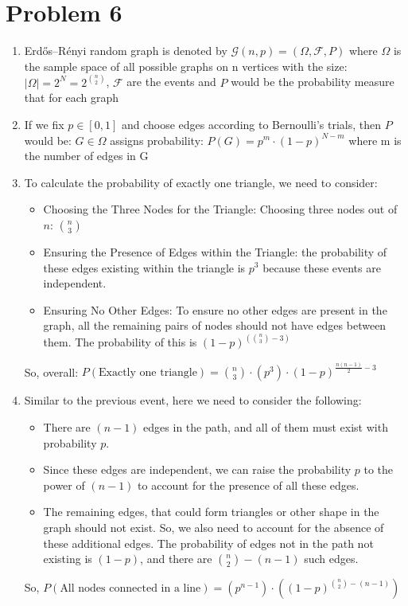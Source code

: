 	\section*{Problem 6}\label{sec:prob-6}
	\begin{enumerate}
	\item Erd\H{o}s--R\'enyi random graph is denoted by $\mathcal{G}(n,p) = (\Omega, \mathcal{F}, P)$  where $ \Omega $ is the sample space of all possible graphs on n vertices with the size: $ |\Omega| = 2^N = 2^{n \choose 2}$, $ \mathcal{F} $ are the events and $ P $ would be the probability measure that for each graph
	\item If we fix $ p \in [0, 1] $ and choose edges according to Bernoulli’s trials, then $ P $ would be: $G \in \Omega $ assigns probability: $ P(G) = p^m \cdot (1 - p)^{N - m} $
	where m is the number of edges in G
	\item To calculate the probability of exactly one triangle, we need to consider:
	\begin{itemize}
	\item Choosing the Three Nodes for the Triangle:
	Choosing three nodes out of $ n $: $ {n \choose 3} $
	\item Ensuring the Presence of Edges within the Triangle:
	the probability of these edges existing within the triangle is $ p^3 $ because these events are independent.
	\item Ensuring No Other Edges:
	To ensure no other edges are present in the graph, all the remaining pairs of nodes should not have edges between them. The probability of this is $ (1-p)^{({n \choose 3} - 3)} $
	\end{itemize}	
	So, overall: $ P(\text{Exactly one triangle}) = \binom{n}{3} \cdot (p^3) \cdot (1-p)^{\frac{n(n-1)}{2} - 3} $

	\item Similar to the previous event, here we need to consider the following:
	\begin{itemize}
	\item There are $ (n-1) $ edges in the path, and all of them must exist with probability $ p $.
	\item Since these edges are independent, we can raise the probability $ p $ to the power of $ (n-1) $ to account for the presence of all these edges.
	\item The remaining edges, that could form triangles or other shape in the graph should not exist. So, we also need to account for the absence of these additional edges.
	The probability of edges not in the path not existing is $ (1 - p) $, and there are $ {n \choose 2} - (n - 1) $ such edges.
	\end{itemize}	
	So, $ P(\text{All nodes connected in a line}) = (p^{n-1}) \cdot ((1 - p)^{\binom{n}{2} - (n - 1)}) $
	

\end{enumerate}
